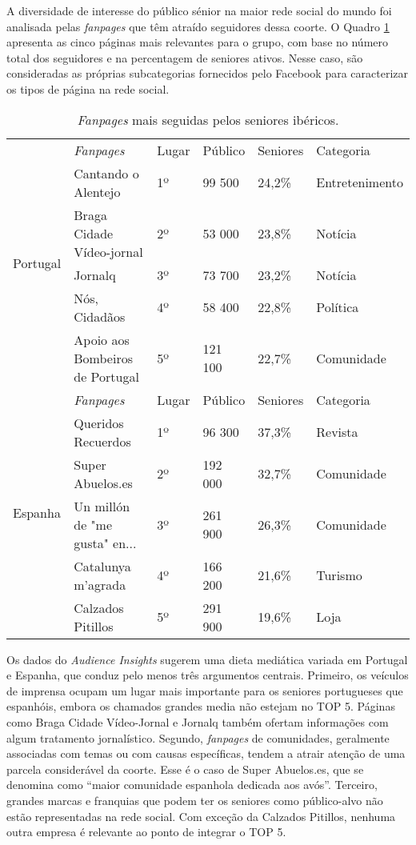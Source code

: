 \documentclass[portuguese]{textolivre}
\begin{document}
A diversidade de interesse do público sénior na maior rede social do mundo foi   analisada pelas \emph{fanpages} que têm atraído seguidores dessa coorte. O Quadro \ref{tab2} apresenta as cinco páginas mais relevantes para o grupo, com base no número total dos seguidores e na percentagem de seniores ativos. Nesse caso, são consideradas as próprias subcategorias fornecidos pelo Facebook para caracterizar os tipos de página na rede social.

\begin{table}[htpb]
\caption{\emph{Fanpages} mais seguidas pelos seniores ibéricos.}
\label{tab2}
\centering
\begin{tabular}{llllll}
\toprule 
\multirow{6}{*}{Portugal} & \emph{Fanpages}
& Lugar & Público & Seniores & Categoria
\\
\cmidrule{2-6}
& Cantando o Alentejo & 1º & 99 500 & 24,2\% & Entretenimento
\\
& Braga Cidade Vídeo-jornal & 2º & 53 000 & 23,8\% & Notícia
\\
& Jornalq & 3º & 73 700 & 23,2\% & Notícia
\\
& Nós, Cidadãos & 4º & 58 400 & 22,8\% & Política
\\
& Apoio aos Bombeiros de Portugal & 5º & 121 100 & 22,7\% & Comunidade
\\
\midrule
\multirow{6}{*}{Espanha} & \emph{Fanpages}
& Lugar & Público & Seniores & Categoria 
\\
\cmidrule{2-6}
& Queridos Recuerdos & 1º & 96 300 & 37,3\% & Revista
\\
& Super Abuelos.es & 2º & 192 000 & 32,7\% & Comunidade
\\
& Un millón de "me gusta" en... & 3º & 261 900 & 26,3\% & Comunidade
\\
& Catalunya m'agrada & 4º & 166 200 & 21,6\% & Turismo
\\
& Calzados Pitillos & 5º & 291 900 & 19,6\% & Loja
\\ 
\bottomrule
\end{tabular}
\end{table}

Os dados do \emph{Audience Insights} sugerem uma dieta mediática variada em Portugal e Espanha, que conduz pelo menos três argumentos centrais. Primeiro, os veículos de imprensa ocupam um lugar mais importante para os seniores portugueses que espanhóis, embora os chamados grandes media não estejam no TOP 5. Páginas como Braga Cidade Vídeo-Jornal e Jornalq também ofertam informações com algum tratamento jornalístico. Segundo, \emph{fanpages} de comunidades, geralmente associadas com temas ou com causas específicas, tendem a atrair atenção de uma parcela considerável da coorte. Esse é o caso de Super Abuelos.es, que se denomina como “maior comunidade espanhola dedicada aos avós”. Terceiro, grandes marcas e franquias que podem ter os seniores como público-alvo não estão representadas na rede social. Com exceção da Calzados Pitillos, nenhuma outra empresa é relevante ao ponto de integrar o TOP 5.
\end{document}
